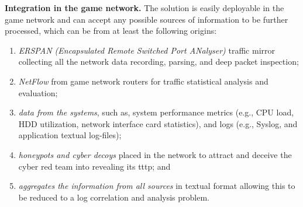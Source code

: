 \textbf{Integration in the game network.}
The solution is easily deployable in the game network and can accept any possible sources of information to be further processed, which can be from at least the following origins:
\begin{enumerate}
    \item \textit{ERSPAN (Encapsulated Remote Switched Port ANalyser)} traffic mirror collecting all the network data recording, parsing, and deep packet inspection;
    \item \textit{NetFlow} from game network routers for traffic statistical analysis and evaluation;
    \item \textit{data from the systems}, such as, system performance metrics (e.g., CPU load, HDD utilization, network interface card statistics), and logs (e.g., Syslog, and application textual log-files);
    \item \textit{honeypots and cyber decoys} placed in the network to attract and deceive the cyber red team into revealing its \gls{tttp}; and
    \item \textit{aggregates the information from all sources} in textual format allowing this to be reduced to a log correlation and analysis problem.
\end{enumerate}

